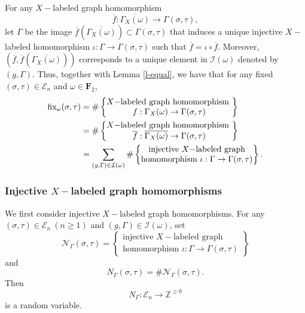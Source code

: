 \documentclass{amsart}
\theoremstyle{plain}
\theoremstyle{definition}
\theoremstyle{remark}
\begin{document}
\noindent For any $X-$labeled graph homomorphism $$\overline{f}:\overline{\Gamma_X(\omega)}\to\Gamma(\sigma,\tau),$$ 
let $\Gamma$ be the image $\overline{f}\left(\overline{\Gamma_X(\omega)}\right)\subset \Gamma(\sigma,\tau)$ that induces a unique injective $X-$labeled homomorphism $\iota:\Gamma\to\Gamma(\sigma,\tau)$ such that $\overline{f}=\iota\circ \overline{f}$. Moreover, $\left(\overline{f}, \overline{f}\left(\overline{\Gamma_X(\omega)}\right)\right)$ corresponds to a unique element in $\mathcal{I}(\omega)$ denoted by $(g,\Gamma)$. Thus, together with Lemma \ref{l-equal}, we have that for any fixed $(\sigma,\tau)\in\mathcal{E}_n$ and $\omega\in\textbf{F}_2$,
\begin{equation}
\begin{aligned}\label{e-f}
  \textnormal{fix}_\omega(\sigma,\tau)&=\#\left\{\begin{matrix}\text{$X-$labeled graph homomorphism }\\ f:\Gamma_X(\omega)\to\Gamma(\sigma,\tau)\end{matrix} \right\}\\
   &=\#\left\{\begin{matrix}\text{$X-$labeled graph homomorphism }\\ \overline{f}:\overline{\Gamma_X(\omega)}\to\Gamma(\sigma,\tau) \end{matrix}\right\}\\
   &=\sum\limits_{(g,\Gamma)\in\mathcal{I}(\omega)}\#\left\{\begin{matrix}\text{injective $X-$labeled graph}\\ \text{homomorphism }  \iota:\Gamma\to\Gamma(\sigma,\tau)\end{matrix}\right\}.
\end{aligned}
\end{equation}
\subsubsection{Injective $X-$labeled graph homomorphisms}\label{subsec-inj}
We first consider injective $X-$labeled graph homomorphisms. For any $(\sigma,\tau)\in\mathcal{E}_n\ (n\geq 1)$ and $(g,\Gamma)\in\mathcal{I}(\omega)$, set
$$\mathcal{N}_{\Gamma}(\sigma,\tau)=\left\{\begin{matrix}\text{injective $X-$labeled graph }\\ \text{homomorphism }\iota:\Gamma\to\Gamma(\sigma,\tau)\end{matrix}\right\}$$
and 
$$N_\Gamma(\sigma,\tau)=\#\mathcal{N}_\Gamma(\sigma,\tau).$$
Then $$N_\Gamma:\mathcal{E}_n\to\mathbb{Z}^{\geq 0}$$ is a random variable.
\end{document}
